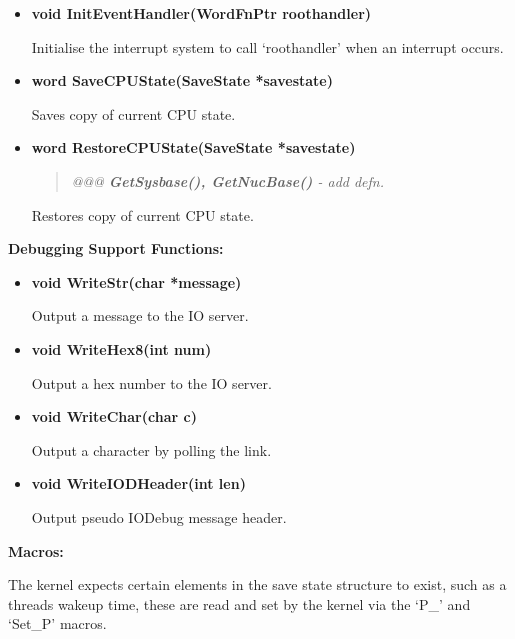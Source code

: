 \begin{itemize}
\item {\bf void InitEventHandler(WordFnPtr roothandler)} 

Initialise the interrupt system to call `roothandler' when an interrupt occurs.

\item {\bf word SaveCPUState(SaveState *savestate)} 

Saves copy of current CPU state.

\item {\bf word RestoreCPUState(SaveState *savestate)} 

\begin{quote}
\it
@@@ {\bf GetSysbase(), GetNucBase()} - add defn.
\rm
\end{quote}

Restores copy of current CPU state.

\end{itemize}
\vspace{0.25cm}

{\bf Debugging Support Functions:}
\vspace{0.25cm}

\begin{itemize}
\item {\bf void WriteStr(char *message)} 

Output a message to the IO server.

\item {\bf void WriteHex8(int num)} 

Output a hex number to the IO server.

\item {\bf void WriteChar(char c)} 

Output a character by polling the link.

\item {\bf void WriteIODHeader(int len)} 

Output pseudo IODebug message header.

\end{itemize}
\vspace{0.25cm}

{\bf Macros:}
\vspace{0.25cm}

The kernel expects certain elements in the save
state structure to exist, such as a threads 
wakeup time, these are read and set by the
kernel via the `P\_' and `Set\_P' macros. 
\vspace{0.25cm}

